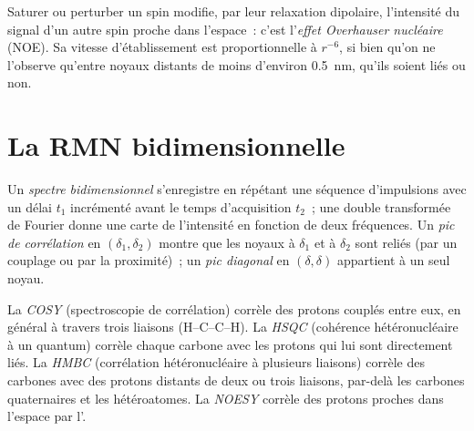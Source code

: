 \begin{definition}\label{def:b3:advanced-nmr:noe}
Saturer ou perturber un spin modifie, par leur relaxation dipolaire,
l'intensité du signal d'un autre spin proche dans l'espace~: c'est
l'\emph{effet Overhauser nucléaire} (NOE).
Sa vitesse d'établissement est proportionnelle à $r^{-6}$, si bien qu'on
ne l'observe qu'entre noyaux distants de moins d'environ \qty{0.5}{nm},
qu'ils soient liés ou non.
\end{definition}

\section{La RMN bidimensionnelle}

\begin{definition}\label{def:b3:advanced-nmr:two-d}
Un \emph{spectre bidimensionnel} s'enregistre
en répétant une séquence d'impulsions avec un délai $t_1$ incrémenté
avant le temps d'acquisition $t_2$~; une double transformée de Fourier
donne une carte de l'intensité en fonction de deux fréquences. Un
\emph{pic de corrélation} en $(\delta_1,
\delta_2)$ montre que les noyaux à $\delta_1$ et à $\delta_2$ sont reliés
(par un couplage ou par la proximité)~; un \emph{pic
diagonal} en $(\delta, \delta)$ appartient à un seul
noyau.
\end{definition}

\begin{definition}\label{def:b3:advanced-nmr:experiments}
La \emph{COSY} (spectroscopie de corrélation) corrèle des
protons couplés entre eux, en général à travers trois liaisons
(H--C--C--H). La \emph{HSQC}
(cohérence hétéronucléaire à un quantum) corrèle chaque carbone avec les
protons qui lui sont directement liés. La \emph{HMBC}
(corrélation hétéronucléaire à plusieurs liaisons) corrèle des carbones
avec des protons distants de deux ou trois liaisons, par-delà les
carbones quaternaires et les hétéroatomes. La \emph{NOESY}
corrèle des protons proches dans l'espace par l'.
\end{definition}

